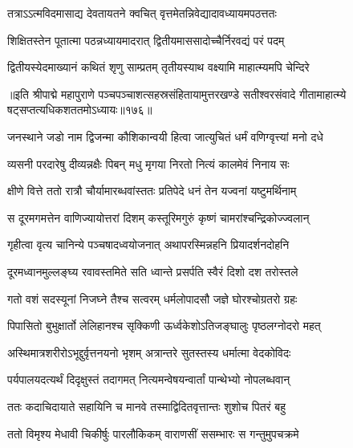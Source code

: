 \twolineshloka
{तत्राऽऽत्मविदमासाद्य देवतायतने क्वचित्}
{वृत्तमेतन्निवेद्यादावध्यायमपठत्ततः} %

\twolineshloka
{शिक्षितस्तेन पूतात्मा पठन्नध्यायमादरात्}
{द्वितीयमाससादोच्चैर्निरवद्यं परं पदम्} %

\twolineshloka
{द्वितीयस्येदमाख्यानं कथितं शृणु साम्प्रतम्}
{तृतीयस्याथ वक्ष्यामि माहात्म्यमपि चेन्दिरे} %

॥इति श्रीपाद्मे महापुराणे पञ्चपञ्चाशत्सहस्रसंहितायामुत्तरखण्डे सतीश्वरसंवादे गीतामाहात्म्ये षट्सप्तत्यधिकशततमोऽध्यायः॥१७६॥

\genMangalaShloka

\closesub

\ganapatyadiDhyanam
\padmaPuranam



\twolineshloka
{जनस्थाने जडो नाम द्विजन्मा कौशिकान्वयी}
{हित्वा जात्युचितं धर्मं वणिग्वृत्त्यां मनो दधे} %

\twolineshloka
{व्यसनी परदारेषु दीव्यन्नक्षैः पिबन् मधु}
{मृगया निरतो नित्यं कालमेवं निनाय सः} %

\twolineshloka
{क्षीणे वित्ते ततो रात्रौ चौर्यामारब्धवांस्ततः}
{प्रतिपेदे धनं तेन यज्वनां यष्टुमर्थिनाम्} %

\twolineshloka
{स दूरमगमत्तेन वाणिज्यायोत्तरां दिशम्}
{कस्तूरिमगुरुं कृष्णं चामरांश्चन्द्रिकोज्ज्वलान्} %

\twolineshloka
{गृहीत्वा वृत्य चानिन्ये पञ्चषादध्वयोजनात्}
{अथापरस्मिन्नहनि प्रियादर्शनदोहनि} %

\twolineshloka
{दूरमध्वानमुल्लङ्घ्य रवावस्तमिते सति}
{ध्वान्ते प्रसर्पति स्वैरं दिशो दश तरोस्तले} %

\twolineshloka
{गतो वशं सदस्यूनां निजघ्ने तैश्च सत्वरम्}
{धर्मलोपादसौ जज्ञे घोरश्चोग्रतरो ग्रहः} %

\twolineshloka
{पिपासितो बुभुक्षार्तो लेलिहानश्च सृक्किणी}
{ऊर्ध्वकेशोऽतिजङ्घालुः पृष्ठलग्नोदरो महत्} %

\twolineshloka
{अस्थिमात्रशरीरोऽभूद्दुर्वृत्तनयनो भृशम्}
{अत्रान्तरे सुतस्तस्य धर्मात्मा वेदकोविदः} %

\twolineshloka
{पर्यपालयदत्यर्थं दिदृक्षुस्तं तदागमत्}
{नित्यमन्वेषयन्वार्तां पान्थेभ्यो नोपलब्धवान्} %

\twolineshloka
{ततः कदाचिदायाते सहायिनि च मानवे}
{तस्माद्विदितवृत्तान्तः शुशोच पितरं बहु} %

\twolineshloka
{ततो विमृश्य मेधावी चिकीर्षुः पारलौकिकम्}
{वाराणसीं ससम्भारः स गन्तुमुपचक्रमे} %

